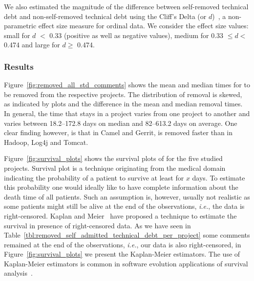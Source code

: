 


We also estimated the magnitude of the difference between self-removed technical debt and non-self-removed technical debt using the Cliff's Delta (or $d$)~\cite{grissom2005effect}, a non-parametric effect size measure for ordinal data. We consider the effect size values: small for $d$ $<$ 0.33 (positive as well as negative values), medium for 0.33  $\leq d<$ 0.474 and large for $d \geq$ 0.474.

\subsubsection*{Results} Figure~\ref{fig:removed_all_std_comments} shows the mean and median times for \SATD to be removed from the respective projects. The distribution of \SATD removal is skewed, as indicated by plots and the difference in the mean and median removal times. In general, the time that \SATD stays in a project  varies from one project to another and varies between 18.2--172.8 days on median and 82--613.2 days on average. One clear finding however, is that in Camel and Gerrit, \SATD is removed faster than in Hadoop, Log4j and Tomcat.

Figure~\ref{fig:survival_plots} shows the survival plots of \SATD for the five studied projects. Survival plot is a technique originating from the medical domain indicating the probability of a patient to survive at least for $x$ days. To estimate this probability one would ideally like to 
have complete information about the death time of all patients. Such an assumption is, however,
usually not realistic as some patients might still be alive at the end of the observations, \emph{i.e.},
the data is right-censored. Kaplan
and Meier~\cite{kaplan1958nonparametric} have proposed a technique to estimate the survival
in presence of right-censored data. As we have seen in Table~\ref{tbl:removed_self_admitted_technical_debt_per_project} some \SATD comments remained at
the end of the observations, \emph{i.e.}, our data is also right-censored, in Figure~\ref{fig:survival_plots}
we present the Kaplan-Meier estimators. The use of Kaplan-Meier estimators is common in 
software evolution applications of survival analysis~\cite{samoladas2010survival,goeminne2015towards}.

